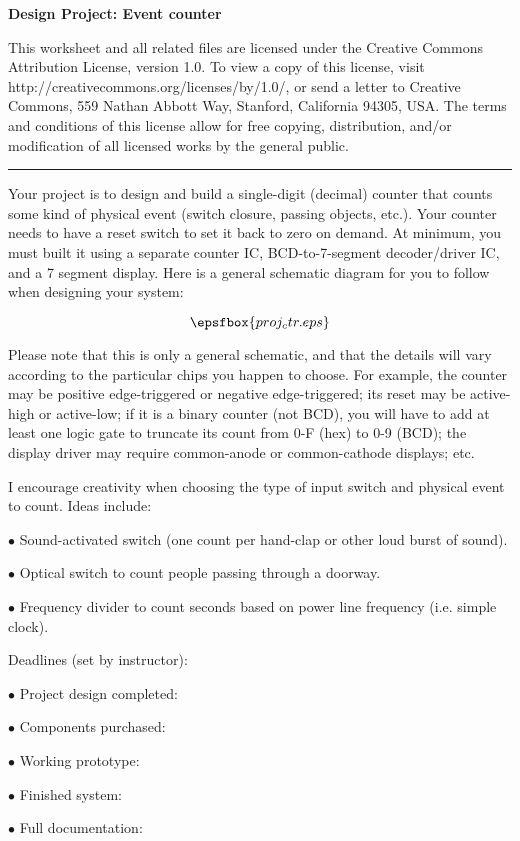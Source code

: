 
\centerline{\bf Design Project: Event counter} \bigskip 
 
This worksheet and all related files are licensed under the Creative Commons Attribution License, version 1.0.  To view a copy of this license, visit http://creativecommons.org/licenses/by/1.0/, or send a letter to Creative Commons, 559 Nathan Abbott Way, Stanford, California 94305, USA.  The terms and conditions of this license allow for free copying, distribution, and/or modification of all licensed works by the general public.

\bigskip 

\hrule

\vskip 10pt

Your project is to design and build a single-digit (decimal) counter that counts some kind of physical event (switch closure, passing objects, etc.).  Your counter needs to have a reset switch to set it back to zero on demand.  At minimum, you must built it using a separate counter IC, BCD-to-7-segment decoder/driver IC, and a 7 segment display.  Here is a general schematic diagram for you to follow when designing your system:

$$\epsfbox{proj_ctr.eps}$$

Please note that this is only a general schematic, and that the details will vary according to the particular chips you happen to choose.  For example, the counter may be positive edge-triggered or negative edge-triggered; its reset may be active-high or active-low; if it is a binary counter (not BCD), you will have to add at least one logic gate to truncate its count from 0-F (hex) to 0-9 (BCD); the display driver may require common-anode or common-cathode displays; etc.

I encourage creativity when choosing the type of input switch and physical event to count.  Ideas include:

\medskip
\goodbreak
\item{$\bullet$} Sound-activated switch (one count per hand-clap or other loud burst of sound).
\item{$\bullet$} Optical switch to count people passing through a doorway.
\item{$\bullet$} Frequency divider to count seconds based on power line frequency (i.e. simple clock).
\medskip

\vskip 10pt

\noindent
Deadlines (set by instructor):

\medskip
\item{$\bullet$} Project design completed: 
\item{$\bullet$} Components purchased:
\item{$\bullet$} Working prototype:
\item{$\bullet$} Finished system:
\item{$\bullet$} Full documentation:
\medskip



